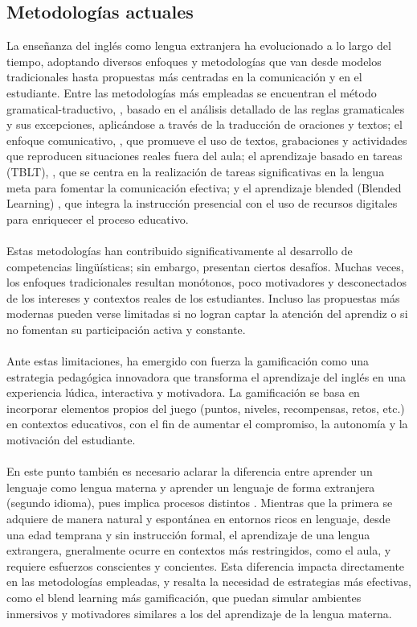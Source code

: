 \subsection{Metodolog\'ias actuales}
La enseñanza del inglés como lengua extranjera ha evolucionado a lo largo del tiempo, adoptando diversos enfoques y metodologías que van desde modelos tradicionales hasta propuestas más centradas en la comunicación y en el estudiante. Entre las metodologías más empleadas se encuentran el método gramatical-traductivo, \cite{metodogramaticatrad}, basado en el análisis detallado de las reglas gramaticales y sus excepciones, aplicándose a través de la traducción de oraciones y textos; el enfoque comunicativo, \cite{enfoquecomunicativo}, que promueve el uso de textos, grabaciones y actividades que reproducen situaciones reales fuera del aula; el aprendizaje basado en tareas (TBLT), \cite{TBLT}, que se centra en la realización de tareas significativas en la lengua meta para fomentar la comunicación efectiva; y el aprendizaje blended (Blended Learning) \cite{salinas2010entrenamiento}, que integra la instrucción presencial con el uso de recursos digitales para enriquecer el proceso educativo.
\\
\\
Estas metodolog\'ias han contribuido significativamente al desarrollo de competencias ling\"u\'isticas; sin embargo, presentan ciertos desaf\'ios. Muchas veces, los enfoques tradicionales resultan mon\'otonos, poco motivadores y desconectados de los intereses y contextos reales de los estudiantes. Incluso las propuestas m\'as modernas pueden verse limitadas si no logran captar la atenci\'on del aprendiz o si no fomentan su participaci\'on activa y constante.
\\
\\
Ante estas limitaciones, ha emergido con fuerza la gamificaci\'on como una estrategia pedag\'ogica innovadora que transforma el aprendizaje del ingl\'es en una experiencia l\'udica, interactiva y motivadora. La gamificaci\'on se basa en incorporar elementos propios del juego (puntos, niveles, recompensas, retos, etc.) en contextos educativos, con el fin de aumentar el compromiso, la autonom\'ia y la motivaci\'on del estudiante.
\\
\\
En este punto también es necesario aclarar la diferencia entre aprender un lenguaje como lengua materna y aprender un lenguaje de forma extranjera (segundo idioma), pues implica procesos distintos \cite{flores2015using}. Mientras que la primera se adquiere de manera natural y espont\'anea en entornos ricos en lenguaje, desde una edad temprana y sin instrucci\'on formal, el aprendizaje de una lengua extrangera, gneralmente ocurre en contextos m\'as restringidos, como el aula, y requiere esfuerzos conscientes y concientes. Esta diferencia impacta directamente en las metodologías empleadas, y resalta la necesidad de estrategias más efectivas, como el blend learning más gamificación, que puedan simular ambientes inmersivos y motivadores similares a los del aprendizaje de la lengua materna.
